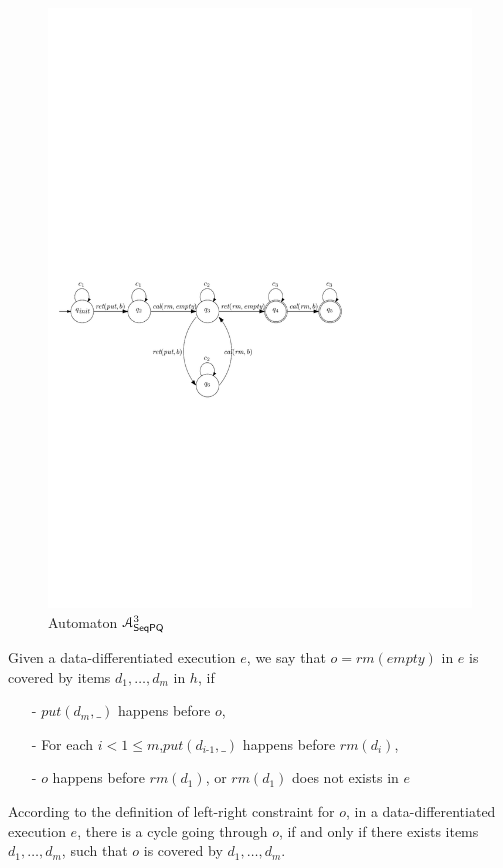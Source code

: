 \begin{figure}[htbp]
  \centering
  \includegraphics[width=0.8 \textwidth]{figures/PIC_AUTO_PQ3.pdf}
  \caption{Automaton $\mathcal{A}_{\mathsf{SeqPQ}}^3$}
  \label{fig:automata for PQ3}
\end{figure}

Given a data-differentiated execution $e$, we say that $o = \textit{rm}(\textit{empty})$ in $e$ is covered by items $d_1,\ldots,d_m$ in $h$, if

\begin{itemize}
\setlength{\itemsep}{0.5pt}
\item[-] $\textit{put}(d_m,\_)$ happens before $o$,

\item[-] For each $i < 1 \leq m$,$\textit{put}(d_{\textit{i-1}},\_)$ happens before $\textit{rm}(d_i)$,

\item[-] $o$ happens before $\textit{rm}(d_1)$, or $\textit{rm}(d_1)$ does not exists in $e$
\end{itemize}

According to the definition of left-right constraint for $o$, in a data-differentiated execution $e$, there is a cycle going through $o$, if and only if there exists items $d_1,\ldots,d_m$, such that $o$ is covered by $d_1,\ldots,d_m$.


